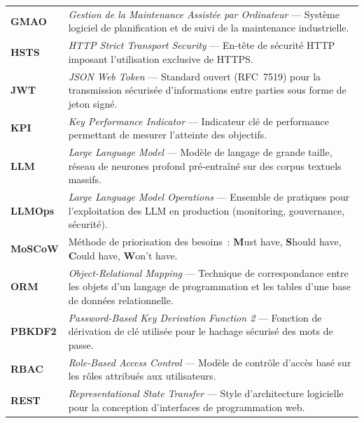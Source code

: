 \begin{longtable}{p{3.5cm} p{11cm}}
\textbf{GMAO} & \textit{Gestion de la Maintenance Assistée par Ordinateur} --- Système logiciel de planification et de suivi de la maintenance industrielle. \\[6pt]

\textbf{HSTS} & \textit{HTTP Strict Transport Security} --- En-tête de sécurité HTTP imposant l'utilisation exclusive de HTTPS. \\[6pt]

\textbf{JWT} & \textit{JSON Web Token} --- Standard ouvert (RFC~7519) pour la transmission sécurisée d'informations entre parties sous forme de jeton signé. \\[6pt]

\textbf{KPI} & \textit{Key Performance Indicator} --- Indicateur clé de performance permettant de mesurer l'atteinte des objectifs. \\[6pt]

\textbf{LLM} & \textit{Large Language Model} --- Modèle de langage de grande taille, réseau de neurones profond pré-entraîné sur des corpus textuels massifs. \\[6pt]

\textbf{LLMOps} & \textit{Large Language Model Operations} --- Ensemble de pratiques pour l'exploitation des LLM en production (monitoring, gouvernance, sécurité). \\[6pt]

\textbf{MoSCoW} & Méthode de priorisation des besoins~: \textbf{M}ust have, \textbf{S}hould have, \textbf{C}ould have, \textbf{W}on't have. \\[6pt]

\textbf{ORM} & \textit{Object-Relational Mapping} --- Technique de correspondance entre les objets d'un langage de programmation et les tables d'une base de données relationnelle. \\[6pt]

\textbf{PBKDF2} & \textit{Password-Based Key Derivation Function 2} --- Fonction de dérivation de clé utilisée pour le hachage sécurisé des mots de passe. \\[6pt]

\textbf{RBAC} & \textit{Role-Based Access Control} --- Modèle de contrôle d'accès basé sur les rôles attribués aux utilisateurs. \\[6pt]

\textbf{REST} & \textit{Representational State Transfer} --- Style d'architecture logicielle pour la conception d'interfaces de programmation web. \\[6pt]


\end{longtable}
